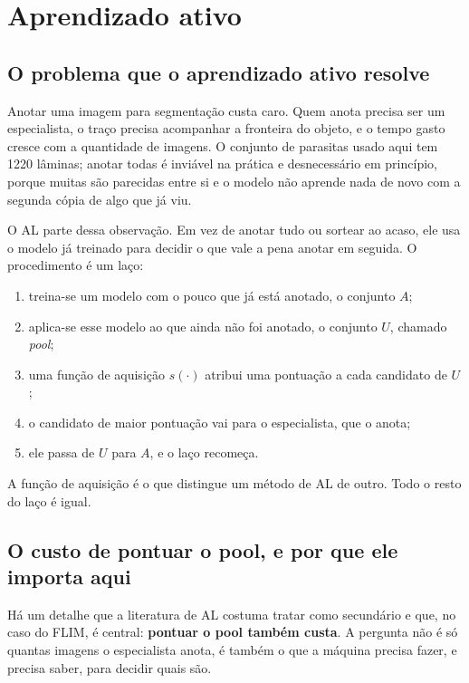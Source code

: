 \section{Aprendizado ativo}
\label{sec_al_metodo}

\subsection{O problema que o aprendizado ativo resolve}

Anotar uma imagem para segmentação custa caro. Quem anota precisa ser um especialista, o traço precisa acompanhar a fronteira do objeto, e o tempo gasto cresce com a quantidade de imagens. O conjunto de parasitas usado aqui tem 1220 lâminas; anotar todas é inviável na prática e desnecessário em princípio, porque muitas são parecidas entre si e o modelo não aprende nada de novo com a segunda cópia de algo que já viu.

O \ac{AL} parte dessa observação. Em vez de anotar tudo ou sortear ao acaso, ele usa o modelo já treinado para decidir o que vale a pena anotar em seguida. O procedimento é um laço:

\begin{enumerate}
    \item treina-se um modelo com o pouco que já está anotado, o conjunto $A$;
    \item aplica-se esse modelo ao que ainda não foi anotado, o conjunto $U$, chamado \emph{pool};
    \item uma função de aquisição $s(\cdot)$ atribui uma pontuação a cada candidato de $U$;
    \item o candidato de maior pontuação vai para o especialista, que o anota;
    \item ele passa de $U$ para $A$, e o laço recomeça.
\end{enumerate}

A função de aquisição é o que distingue um método de \ac{AL} de outro. Todo o resto do laço é igual.

\subsection{O custo de pontuar o pool, e por que ele importa aqui}
\label{sec_custo_pool}

Há um detalhe que a literatura de \ac{AL} costuma tratar como secundário e que, no caso do \ac{FLIM}, é central: \textbf{pontuar o pool também custa}. A pergunta não é só quantas imagens o especialista anota, é também o que a máquina precisa fazer, e precisa saber, para decidir quais são.

